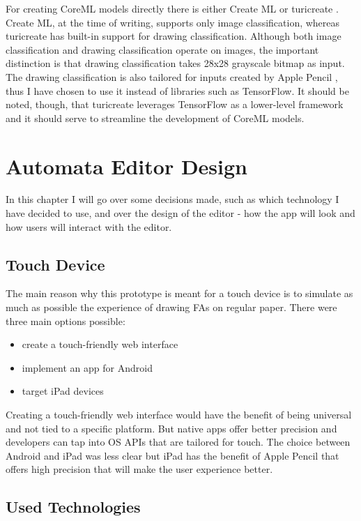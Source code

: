 For creating CoreML models directly there is either Create ML \cite{create-ml} or turicreate \cite{turicreate}. Create ML, at the time of writing, supports only image classification, whereas turicreate has built-in support for drawing classification. Although both image classification and drawing classification operate on images, the important distinction is that drawing classification takes 28x28 grayscale bitmap as input. The drawing classification is also tailored for inputs created by Apple Pencil \cite{drawing-classification}, thus I have chosen to use it instead of libraries such as TensorFlow. It should be noted, though, that turicreate leverages TensorFlow as a lower-level framework and it should serve to streamline the development of CoreML models.

\chapter{Automata Editor Design}
\label{chap:design}

In this chapter I will go over some decisions made, such as which technology I have decided to use, and over the design of the editor - how the app will look and how users will interact with the editor.

\section{Touch Device}
The main reason why this prototype is meant for a touch device is to simulate as much as possible the experience of drawing FAs on regular paper. There were three main options possible:
\begin{itemize}
    \item create a touch-friendly web interface
    \item implement an app for Android
    \item target iPad devices
\end{itemize}
Creating a touch-friendly web interface would have the benefit of being universal and not tied to a specific platform. But native apps offer better precision and developers can tap into OS APIs that are tailored for touch. The choice between Android and iPad was less clear but iPad has the benefit of Apple Pencil \cite{apple-pencil} that offers high precision that will make the user experience better.

\section{Used Technologies}

